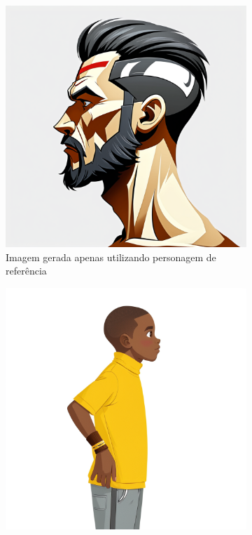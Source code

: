 \begin{figure}[htbp]
    \centering
    \caption{\small Comparativo de resultados do modelo Juggernaut XL com e sem Estilo de referência}
    \label{fig:cgDreamPersonagemComparaJug}
    \begin{subfigure}{0.45\linewidth}
        \includegraphics[width=1\linewidth]{figs/cgDream/res_char_jug8.png}
        \caption{\small Imagem gerada apenas utilizando personagem de referência}
        \label{fig:CGDreamJugSemEstilo}
    \end{subfigure}
    \begin{subfigure}{0.45\linewidth}
        \includegraphics[width=1\linewidth]{figs/cgDream/res_char_jug_estilo1c.png}

\end{subfigure}
\end{figure}
